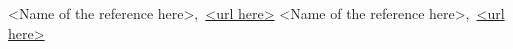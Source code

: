 \cleardoublepage
\pagebreak
{}
{}

\begin{thebibliography}{99}

<Name of the reference here>,\ \url{<url here>}
<Name of the reference here>,\ \url{<url here>}

\end{thebibliography}
